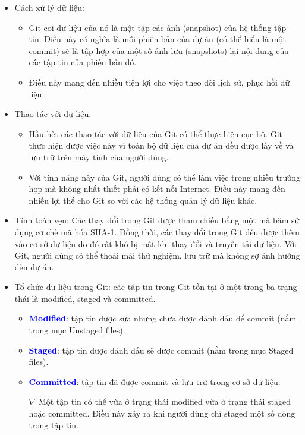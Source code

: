 \documentclass[12pt,a4paper]{report}
\begin{document}
\begin{itemize}
\item Cách xử lý dữ liệu:
	\begin{itemize}
		\item Git coi dữ liệu của nó là một tập các ảnh (snapshot) của hệ thống tập tin. Điều này có nghĩa là mỗi phiên bản của dự án (có thể hiểu là một commit) sẽ là tập hợp của một số ảnh lưu (snapshots) lại nội dung của các tập tin của phiên bản đó.
		\item Điều này mang đến nhiều tiện lợi cho việc theo dõi lịch sử, phục hồi dữ liệu.
	\end{itemize}
\item Thao tác với dữ liệu:
	\begin{itemize}
		\item Hầu hết các thao tác với dữ liệu của Git có thể thực hiện cục bộ. Git thực hiện được việc này vì toàn bộ dữ liệu của dự án đều được lấy về và lưu trữ trên máy tính của người dùng.
		\item Với tính năng này của Git, người dùng có thể làm việc trong nhiều trường hợp mà không nhất thiết phải có kết nối Internet. Điều này mang đến nhiều lợi thế cho Git so với các hệ thống quản lý dữ liệu khác.
		\end{itemize}
\item Tính toàn vẹn: Các thay đổi trong Git được tham chiếu bằng một mã băm sử dụng cơ chế mã hóa SHA-1. Đồng thời, các thay đổi trong Git đều được thêm vào cơ sở dữ liệu do đó rất khó bị mất khi thay đổi và truyền tải dữ liệu. Với Git, người dùng có thể thoải mái thử nghiệm, lưu trữ mà không sợ ảnh hưởng đến dự án.
\item Tổ chức dữ liệu trong Git: các tập tin trong Git tồn tại ở một trong ba trạng thái là modified, staged và committed.
	\begin{itemize}
		\item \textcolor{blue}{\bf Modified}: tập tin được sửa nhưng chưa được đánh dấu để commit (nằm trong mục Unstaged files).
		\item \textcolor{blue}{\bf 	Staged}: tập tin được đánh dấu sẽ được commit (nằm trong mục Staged files).
		\item \textcolor{blue}{\bf Committed}: tập tin đã được commit và lưu trữ trong cơ sở dữ liệu.
		\item[$\nabla$] Một tập tin có thể vừa ở trạng thái modified vừa ở trạng thái staged hoặc committed. Điều này xảy ra khi người dùng chỉ staged một số dòng trong tập tin.

\end{itemize}
\end{itemize}
\end{document}
